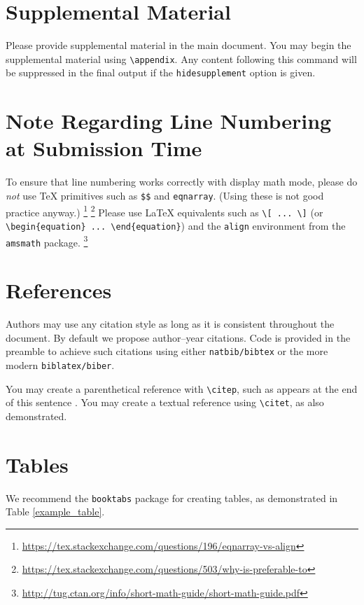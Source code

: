 \documentclass[11pt]{article}
\begin{document}
\section{Supplemental Material}

Please provide supplemental material in the main document. You may begin the
supplemental material using \verb|\appendix|. Any content following this command
will be suppressed in the final output if the \texttt{hidesupplement} option is
given.

\section{Note Regarding Line Numbering at Submission Time}

To ensure that line numbering works correctly with display math mode, please do
\emph{not} use \TeX{} primitives such as \verb|$$| and \texttt{eqnarray}.  (Using
these is not good practice anyway.)%
%
\footnote{\url{https://tex.stackexchange.com/questions/196/eqnarray-vs-align}}%
\footnote{\url{https://tex.stackexchange.com/questions/503/why-is-preferable-to}}
%
Please use \LaTeX{} equivalents such as \verb|\[ ... \]| (or
\verb|\begin{equation} ... \end{equation}|) and the \texttt{align} environment
from the \texttt{amsmath} package.%
%
\footnote{\url{http://tug.ctan.org/info/short-math-guide/short-math-guide.pdf}}

\section{References}

Authors may use any citation style as long as it is consistent throughout the
document. By default we propose author--year citations. Code is provided in the
preamble to achieve such citations using either \texttt{natbib/bibtex} or the
more modern \texttt{biblatex/biber}.

You may create a parenthetical reference with \verb|\citep|, such as appears at
the end of this sentence \citep{example_book}.  You may create a textual
reference using \verb|\citet|, as \citet{example_book} also demonstrated.

\section{Tables}

We recommend the \texttt{booktabs} package for creating tables, as demonstrated
in Table \ref{example_table}.
\end{document}
